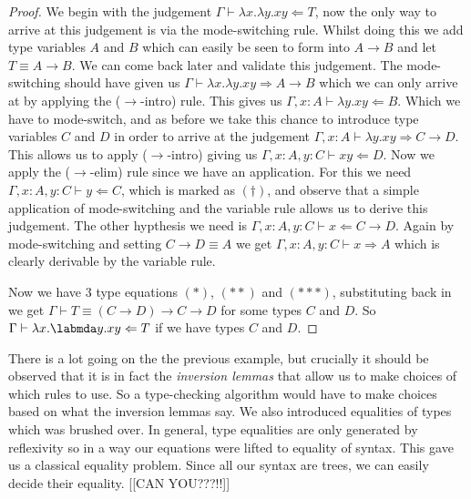\begin{example}
        \begin{proof}
        We begin with the judgement $\Gamma \vdash \lambda x . \lambda y . x y \Leftarrow T$, now the only way to arrive at this judgement is via the mode-switching rule. Whilst doing this we add type variables $A$ and $B$ which can easily be seen to form into $A \to B$ and let $T \equiv A \to B$. We can come back later and validate this judgement. The mode-switching should have given us $\Gamma \vdash \lambda x . \lambda y . x y \Rightarrow A \to B$ which we can only arrive at by applying the ($\to$-intro) rule. This gives us $\Gamma , x : A \vdash \lambda y . xy \Leftarrow B$. Which we have to mode-switch, and as before we take this chance to introduce type variables $C$ and $D$ in order to arrive at the judgement $\Gamma , x : A \vdash \lambda y . x y \Rightarrow C \to D$. This allows us to apply ($\to$-intro) giving us $\Gamma , x : A , y : C \vdash xy \Leftarrow D$. Now we apply the ($\to$-elim) rule since we have an application. For this we need $\Gamma , x : A, y : C \vdash y \Leftarrow C$, which is marked as $(\dagger)$, and observe that a simple application of mode-switching and the variable rule allows us to derive this judgement. The other hypthesis we need is $\Gamma , x : A, y : C \vdash x \Leftarrow C \to D$. Again by mode-switching and setting $C \to D \equiv A$ we get $\Gamma , x : A, y : C \vdash x \Rightarrow A$ which is clearly derivable by the variable rule.
        
        Now we have 3 type equations $(*)$, $(**)$ and $(***)$, substituting back in we get $\Gamma \vdash T \equiv (C \to D) \to C \to D$ for some types $C$ and $D$. So $\Gamma \vdash \lambda x . \labmda y . x y \Leftarrow T$ if we have types $C$ and $D$.
        \end{proof}
\end{example}

\begin{remark}
    There is a lot going on the the previous example, but crucially it should be observed that it is in fact the \emph{inversion lemmas} that allow us to make choices of which rules to use. So a type-checking algorithm would have to make choices based on what the inversion lemmas say. We also introduced equalities of types which was brushed over. In general, type equalities are only generated by reflexivity so in a way our equations were lifted to equality of syntax. This gave us a classical equality problem. Since all our syntax are trees, we can easily decide their equality. [[CAN YOU???!!]]
\end{remark}

